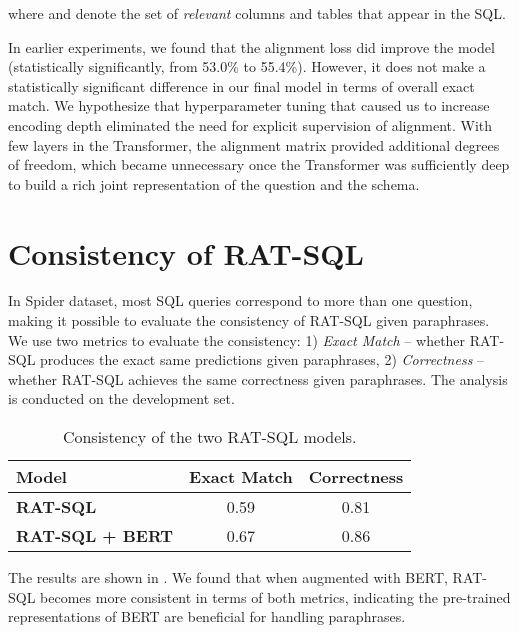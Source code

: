 \documentclass[11pt,a4paper,final]{article}
\begin{document}
where  and  denote the set of \emph{relevant} columns and tables that appear in the SQL.

In earlier experiments, we found that the alignment loss did improve the model (statistically significantly, from 53.0\% to 55.4\%). 
However, it does not make a statistically significant difference in our final model in terms of overall exact match.
We hypothesize that hyperparameter tuning that caused us to increase encoding depth eliminated the need for explicit supervision of alignment.
With few layers in the Transformer, the alignment matrix provided additional degrees of freedom, which became unnecessary once the Transformer was sufficiently deep to build a rich joint representation of the question and the schema.

\section{Consistency of RAT-SQL}
\label{app:consistency}

In Spider dataset, most SQL queries correspond to more than one question, making it possible to evaluate the consistency of RAT-SQL given paraphrases. We use two metrics to evaluate the consistency: 1) \textit{Exact Match} -- whether RAT-SQL produces the exact same predictions given paraphrases, 2) \textit{Correctness} -- whether RAT-SQL achieves the same correctness given paraphrases. The analysis is conducted on the development set.

\begin{table}[t]
\centering
\small
\begin{tabular}{ lcc }
  \toprule
\textbf{Model} & \textbf{Exact Match} & \textbf{Correctness} \\
  \midrule
\textbf{RAT-SQL}  & 0.59 & 0.81 \\
\textbf{RAT-SQL + BERT} & 0.67 & 0.86 \\
\bottomrule
\end{tabular}
\caption{Consistency of the two RAT-SQL models.}
\label{tab:consistency}
\end{table}

The results are shown in . We found that when augmented with BERT, RAT-SQL becomes more consistent in terms of both metrics, indicating the pre-trained representations of BERT are beneficial for handling paraphrases. 
\end{document}
